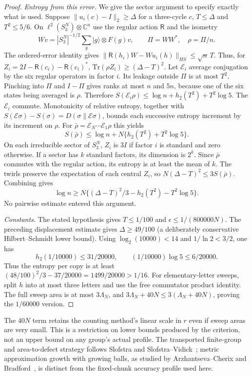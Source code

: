 \documentclass[11pt,a4paper]{article}
\theoremstyle{plain}
\theoremstyle{definition}
\theoremstyle{remark}
\begin{document}
\begin{proof}
\emph{Entropy from this error.} We give the sector argument to specify exactly what is used. Suppose
$\|u_i(c)-I\|_2\ge\Delta$ for a three-cycle $c$, $T\le\Delta$ and $T^2\le5/6$.
On $\ell^2(S_3^N)\otimes\mathbb C^n$ use the regular action $\mathsf R$ and the isometry
\[
 Wv=|S_3^N|^{-1/2}\sum_g|g\rangle\otimes F(g)v,
 \qquad \Pi=WW^*,\quad\rho=\Pi/n.
\]
The ordered-error identity gives $\|\mathsf R(h_i)W-Wu_i(h)\|_{HS}\le\sqrt n\,T$.
Thus, for $Z_i=2I-\mathsf R(c_i)-\mathsf R(c_i)^*$,
$\mathrm{Tr}(\rho Z_i)\ge(\Delta-T)^2$. Let $\mathcal E_i$ average conjugation by the six regular operators in factor $i$.
Its leakage outside $\Pi$ is at most $T^2$. Pinching into $\Pi$ and $I-\Pi$ gives ranks at most $n$ and $5n$, because one of the
six states being averaged is $\rho$. Therefore
$S(\mathcal E_i\rho)\le\log n+h_2(T^2)+T^2\log5$.
The $\mathcal E_i$ commute. Monotonicity of relative entropy, together with
$S(\mathcal E\sigma)-S(\sigma)=D(\sigma\|\mathcal E\sigma)$, bounds each successive entropy increment by its increment on $\rho$.
For $\bar\rho=\mathcal E_N\cdots\mathcal E_1\rho$ this yields
\[
 S(\bar\rho)\le\log n+N\{h_2(T^2)+T^2\log5\}.
\]
On each irreducible sector of $S_3^N$, $Z_i$ is $3I$ if factor $i$ is standard and zero otherwise.
If a sector has $k$ standard factors, its dimension is $2^k$. Since $\bar\rho$ commutes with the regular action, its entropy is
at least the mean of $k$. The twirls preserve the expectation of each central $Z_i$, so
$N(\Delta-T)^2\le3S(\bar\rho)$. Combining gives
\[
 \log n\ge N\{(\Delta-T)^2/3-h_2(T^2)-T^2\log5\}.
\]
No pairwise estimate entered this argument.

\emph{Constants.} The stated hypothesis gives $T\le1/100$ and
$\epsilon\le1/(800000N)$. The preceding displacement estimate gives $\Delta\ge49/100$ (a deliberately conservative
Hilbert--Schmidt lower bound). Using $\log_2(10000)<14$ and $1/\ln2<3/2$, one has
\[
 h_2(1/10000)\le31/20000,\qquad
 (1/10000)\log5\le6/20000.
\]
Thus the entropy per copy is at least
$(48/100)^2/3-37/20000=1499/20000>1/16$.
For elementary-letter sweeps, split $h$ into at most three letters and use the free commutator product identity.
The full sweep area is at most $3\Lambda_N$, and
$3\Lambda_N+40N\le3(\Lambda_N+40N)$, proving the $1/60000$ version.
\end{proof}

The $40N$ term retains the counting method's linear scale in $r$ even if sweep areas are very small. This is a restriction
on lower bounds produced by the criterion, not an upper bound on any group's actual profile.
The transported finite-group and area-to-defect strategy follows Slofstra and Slofstra--Vidick~\cite{Slofstra2018,SlofstraVidick2018};
metric approximation growth with growing balls, as studied by Arzhantseva--Cherix and Bradford~\cite{ArzhantsevaCherix2020,Bradford2021},
is distinct from the fixed-chunk accuracy profile used here.
\end{document}
